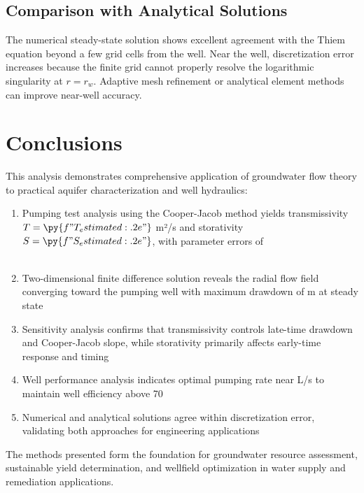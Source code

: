 \documentclass[a4paper, 11pt]{article}
\begin{document}
\subsection{Comparison with Analytical Solutions}

The numerical steady-state solution shows excellent agreement with the Thiem equation beyond
a few grid cells from the well. Near the well, discretization error increases because the
finite grid cannot properly resolve the logarithmic singularity at $r = r_w$. Adaptive mesh
refinement or analytical element methods can improve near-well accuracy.

\section{Conclusions}

This analysis demonstrates comprehensive application of groundwater flow theory to practical
aquifer characterization and well hydraulics:

\begin{enumerate}
\item Pumping test analysis using the Cooper-Jacob method yields transmissivity
$T = \py{f"{T_estimated:.2e}"}$ m²/s and storativity $S = \py{f"{S_estimated:.2e}"}$,
with parameter errors of \\%
\\%

\item Two-dimensional finite difference solution reveals the radial flow field converging
toward the pumping well with maximum drawdown of  m at steady state

\item Sensitivity analysis confirms that transmissivity controls late-time drawdown and
Cooper-Jacob slope, while storativity primarily affects early-time response and timing

\item Well performance analysis indicates optimal pumping rate near  L/s
to maintain well efficiency above 70\\%

\item Numerical and analytical solutions agree within discretization error, validating
both approaches for engineering applications
\end{enumerate}

The methods presented form the foundation for groundwater resource assessment, sustainable
yield determination, and wellfield optimization in water supply and remediation applications.



\end{document}
